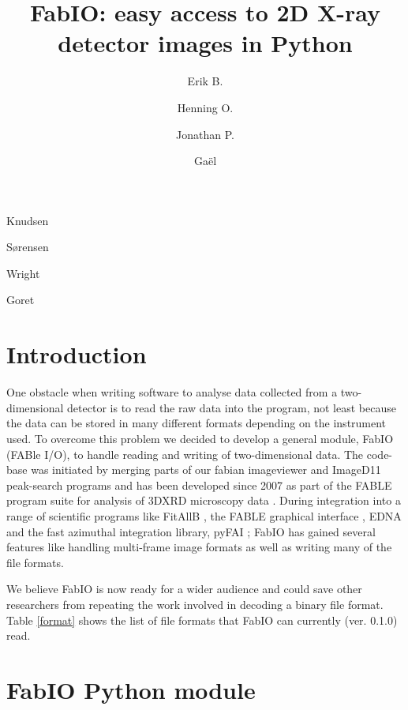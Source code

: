 \documentclass[preprint ]{iucr}
\begin{document}
\title{FabIO: easy access to 2D X-ray detector images in Python}

    \author[a]{Erik B.}{Knudsen}
    \author[b]{Henning O.}{S{\o}rensen}
    \author[c]{Jonathan P.}{Wright}
	\author[c]{Ga\"el}{Goret}

\maketitle

\section{Introduction}

One obstacle when writing software to analyse data collected from a
two-dimensional detector is to read the raw data into the program,
not least because the data can be stored in many different formats
depending on the instrument used.
To overcome this problem we decided to develop a general module,
FabIO (FABle I/O), to handle reading and writing of two-dimensional
data.
The code-base was initiated by merging parts of our fabian imageviewer
\cite{fabian} and ImageD11 \cite{ImageD11} peak-search programs and has
been developed since 2007 as part of the FABLE \cite{fable} program suite
for analysis of 3DXRD microscopy data \cite{3dxrd}.
During integration into a range of scientific programs like FitAllB
\cite{fitallb}, the FABLE graphical interface \cite{fable}, EDNA \cite{edna} and
the fast azimuthal integration library, pyFAI \cite{pyfai}; FabIO has gained
several features like handling multi-frame image formats as well as
writing many of the file formats.

We believe FabIO is now ready for a wider audience and could save other
researchers from repeating the work involved in decoding a
binary file format. Table \ref{format} shows the list of file formats that
FabIO can currently (ver. 0.1.0) read.


\section{FabIO Python module}
\end{document}
